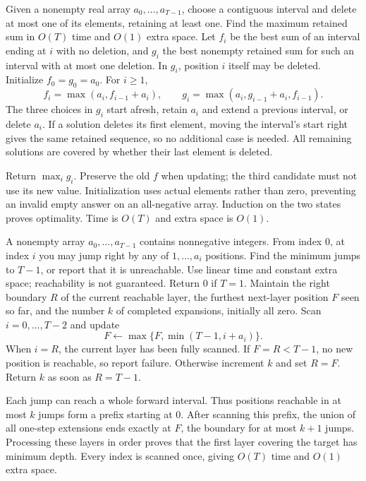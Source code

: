 Given a nonempty real array $a_0,\ldots,a_{T-1}$, choose a contiguous interval and delete at most one of its elements, retaining at least one. Find the maximum retained sum in $O(T)$ time and $O(1)$ extra space.
\solution Let $f_i$ be the best sum of an interval ending at $i$ with no deletion, and $g_i$ the best nonempty retained sum for such an interval with at most one deletion. In $g_i$, position $i$ itself may be deleted. Initialize $f_0=g_0=a_0$. For $i\ge1$,
\[
f_i=\max(a_i,f_{i-1}+a_i),\qquad
g_i=\max(a_i,g_{i-1}+a_i,f_{i-1}).
\]
The three choices in $g_i$ start afresh, retain $a_i$ and extend a previous interval, or delete $a_i$. If a solution deletes its first element, moving the interval's start right gives the same retained sequence, so no additional case is needed. All remaining solutions are covered by whether their last element is deleted.

Return $\max_i g_i$. Preserve the old $f$ when updating; the third candidate must not use its new value. Initialization uses actual elements rather than zero, preventing an invalid empty answer on an all-negative array. Induction on the two states proves optimality. Time is $O(T)$ and extra space is $O(1)$.

A nonempty array $a_0,\ldots,a_{T-1}$ contains nonnegative integers. From index 0, at index $i$ you may jump right by any of $1,\ldots,a_i$ positions. Find the minimum jumps to $T-1$, or report that it is unreachable. Use linear time and constant extra space; reachability is not guaranteed.
\solution Return 0 if $T=1$. Maintain the right boundary $R$ of the current reachable layer, the furthest next-layer position $F$ seen so far, and the number $k$ of completed expansions, initially all zero. Scan $i=0,\ldots,T-2$ and update
\[
F\leftarrow\max\{F,\min(T-1,i+a_i)\}.
\]
When $i=R$, the current layer has been fully scanned. If $F=R<T-1$, no new position is reachable, so report failure. Otherwise increment $k$ and set $R=F$. Return $k$ as soon as $R=T-1$.

Each jump can reach a whole forward interval. Thus positions reachable in at most $k$ jumps form a prefix starting at 0. After scanning this prefix, the union of all one-step extensions ends exactly at $F$, the boundary for at most $k+1$ jumps. Processing these layers in order proves that the first layer covering the target has minimum depth. Every index is scanned once, giving $O(T)$ time and $O(1)$ extra space.

